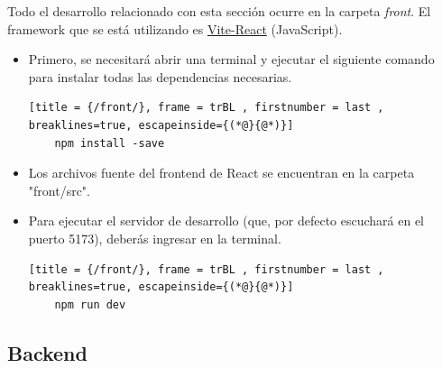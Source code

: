 \documentclass[12pt,epsf,titlepage,a4paper]{article}
\begin{document}
Todo el desarrollo relacionado con esta sección ocurre en la carpeta \emph{front}. El framework que se está utilizando es \href{https://vitejs.dev/}{Vite-React} (JavaScript).
\begin{itemize}
    \item Primero, se necesitará abrir una terminal y ejecutar el siguiente comando para instalar todas las dependencias necesarias.
    \begin{lstlisting}[title = {/front/}, frame = trBL , firstnumber = last , breaklines=true, escapeinside={(*@}{@*)}]
    npm install -save
    \end{lstlisting}
    \item Los archivos fuente del frontend de React se encuentran en la carpeta "front/src".
    \item Para ejecutar el servidor de desarrollo (que, por defecto escuchará en el puerto 5173), deberás ingresar en la terminal.
    \begin{lstlisting}[title = {/front/}, frame = trBL , firstnumber = last , breaklines=true, escapeinside={(*@}{@*)}]
    npm run dev
    \end{lstlisting}
\end{itemize}

\subsection{Backend}
\end{document}
